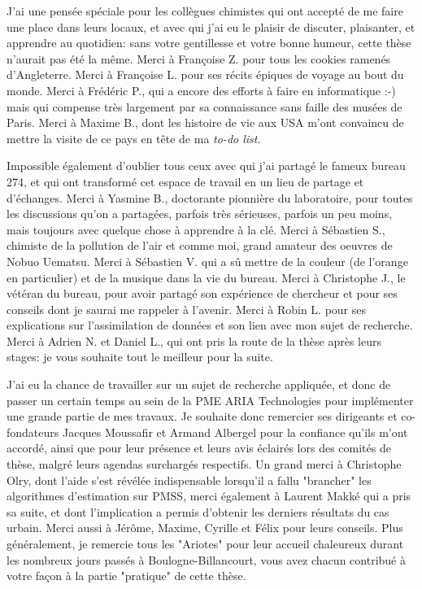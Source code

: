 { 
J'ai une pensée spéciale pour les collègues chimistes qui ont accepté de me faire une place dans leurs locaux, et avec qui j'ai eu le plaisir de discuter, plaisanter, et apprendre au quotidien: sans votre gentillesse et votre bonne humeur, cette thèse n'aurait pas été la même. Merci à Françoise Z. pour tous les cookies ramenés d'Angleterre. Merci à Françoise L. pour ses récits épiques de voyage au bout du monde. Merci à Frédéric P., qui a encore des efforts à faire en informatique :-) mais qui compense très largement par sa connaissance sans faille des musées de Paris. Merci à Maxime B., dont les histoire de vie aux USA m'ont convaincu de mettre la visite de ce pays en tête de ma \textit{to-do list}.

Impossible également d'oublier tous ceux avec qui j'ai partagé le fameux bureau 274, et qui ont transformé cet espace de travail en un lieu de partage et d'échanges. Merci à Yasmine B.,  doctorante pionnière du laboratoire, pour toutes les discussions qu'on a partagées, parfois très sérieuses, parfois un peu moins, mais toujours avec quelque chose à apprendre à la clé. Merci à Sébastien S., chimiste de la pollution de l'air et comme moi, grand amateur des oeuvres de Nobuo Uematsu. Merci à Sébastien V. qui a sû mettre de la couleur (de l'orange en particulier) et de la musique dans la vie du bureau. Merci à Christophe J., le vétéran du bureau, pour avoir partagé son expérience de chercheur et pour ses conseils dont je saurai me rappeler à l'avenir. Merci à Robin L. pour ses explications sur l'assimilation de données et son lien avec mon sujet de recherche. Merci à Adrien N. et Daniel L., qui ont pris la route de la thèse après leurs stages: je vous souhaite tout le meilleur pour la suite.

J'ai eu la chance de travailler sur un sujet de recherche appliquée, et donc de passer un certain temps au sein de la PME ARIA Technologies pour implémenter une grande partie de mes travaux. Je souhaite donc remercier ses dirigeants et co-fondateurs Jacques Moussafir et Armand Albergel pour la confiance qu'ils m'ont accordé,  ainsi que pour leur présence et leurs avis éclairés lors des comités de thèse, malgré leurs agendas surchargés respectifs. Un grand merci à Christophe Olry, dont l'aide s'est révélée indispensable lorsqu'il a fallu "brancher" les algorithmes d'estimation sur PMSS, merci également à Laurent Makké qui a pris sa suite, et dont l'implication a permis d'obtenir les derniers résultats du cas urbain. Merci aussi à Jérôme, Maxime, Cyrille et Félix pour leurs conseils. Plus généralement, je remercie tous les "Ariotes" pour leur accueil chaleureux durant les nombreux jours passés à Boulogne-Billancourt, vous avez chacun contribué à votre façon à la partie "pratique" de cette thèse. \\

}
